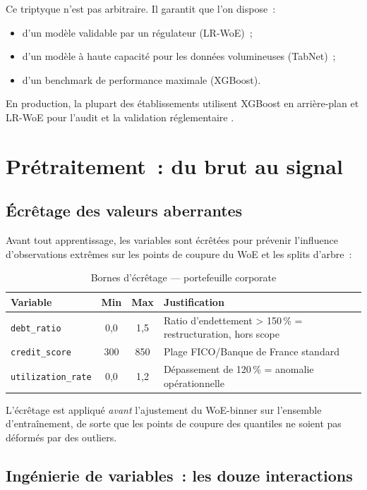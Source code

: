 \documentclass[12pt, a4paper, twoside, openright]{report}
\theoremstyle{definition}
\begin{document}
Ce triptyque n'est pas arbitraire. Il garantit que l'on dispose~:
\begin{itemize}[nosep]
  \item d'un modèle validable par un régulateur (LR-WoE)~;
  \item d'un modèle à haute capacité pour les données volumineuses (TabNet)~;
  \item d'un benchmark de performance maximale (XGBoost).
\end{itemize}

En production, la plupart des établissements utilisent XGBoost en arrière-plan et LR-WoE pour l'audit et la validation réglementaire \citep{anderson2007}.

\section{Prétraitement~: du brut au signal}
\label{sec:pd:pretraitement}

\subsection{Écrêtage des valeurs aberrantes}

Avant tout apprentissage, les variables sont écrêtées pour prévenir l'influence d'observations extrêmes sur les points de coupure du WoE et les splits d'arbre~:

\begin{table}[htbp]
\centering
\caption{Bornes d'écrêtage --- portefeuille corporate}
\label{tab:clipping-corporate}
\begin{tabular}{lccl}
\toprule
Variable & Min & Max & Justification \\
\midrule
\texttt{debt\_ratio} & 0{,}0 & 1{,}5 & Ratio d'endettement > 150\,\% = restructuration, hors scope \\
\texttt{credit\_score} & 300 & 850 & Plage FICO/Banque de France standard \\
\texttt{utilization\_rate} & 0{,}0 & 1{,}2 & Dépassement de 120\,\% = anomalie opérationnelle \\
\bottomrule
\end{tabular}
\end{table}

L'écrêtage est appliqué \emph{avant} l'ajustement du WoE-binner sur l'ensemble d'entraînement, de sorte que les points de coupure des quantiles ne soient pas déformés par des outliers.

\subsection{Ingénierie de variables~: les douze interactions}
\end{document}
